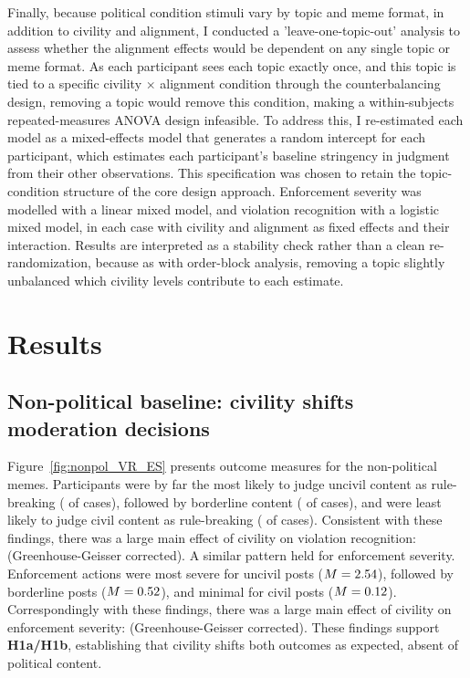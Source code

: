 \documentclass[12pt]{article}
\begin{document}
Finally, because political condition stimuli vary by topic and meme format, in addition to civility and alignment, I conducted a 'leave-one-topic-out' analysis to assess whether the alignment effects would be dependent on any single topic or meme format. As each participant sees each topic exactly once, and this topic is tied to a specific civility $\times$ alignment condition through the counterbalancing design, removing a topic would remove this condition, making a within-subjects repeated-measures ANOVA design infeasible. To address this, I re-estimated each model as a mixed-effects model that generates a random intercept for each participant, which estimates each participant's baseline stringency in judgment from their other observations. This specification was chosen to retain the topic-condition structure of the core design approach. Enforcement severity was modelled with a linear mixed model, and violation recognition with a logistic mixed model, in each case with civility and alignment as fixed effects and their interaction. Results are interpreted as a stability check rather than a clean re-randomization, because as with order-block analysis, removing a topic slightly unbalanced which civility levels contribute to each estimate. 

\section{Results}

\subsection{Non-political baseline: civility shifts moderation decisions}

Figure~\ref{fig:nonpol_VR_ES} presents outcome measures for the non-political memes. Participants were by far the most likely to judge uncivil content as rule-breaking (\BaseVRUncivil{} of cases), followed by borderline content (\BaseVRBorderline{} of cases), and were least likely to judge civil content as rule-breaking (\BaseVRCivil{} of cases). Consistent with these findings, there was a large main effect of civility on violation recognition: \BaseVRCivility{} (Greenhouse-Geisser corrected). A similar pattern held for enforcement severity. Enforcement actions were most severe for uncivil posts ($M = 2.54$), followed by borderline posts ($M = 0.52$), and minimal for civil posts ($M = 0.12$). Correspondingly with these findings, there was a large main effect of civility on enforcement severity: \BaseESCivility{} (Greenhouse-Geisser corrected). These findings support \textbf{H1a/H1b}, establishing that civility shifts both outcomes as expected, absent of political content.
\end{document}
